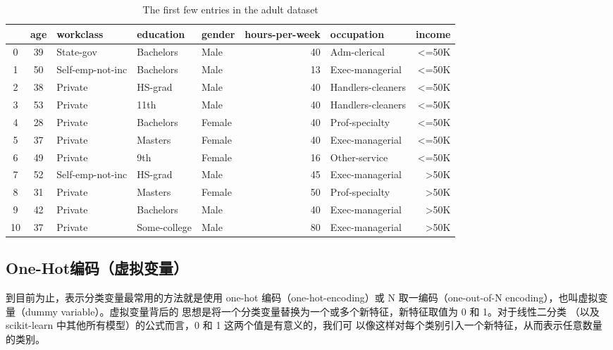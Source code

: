 \begin{table}
    \centering
    \caption{The first few entries in the adult dataset}
    \label{The first few entries in the adult dataset}
    \begin{tabular}{cclllrlr}
        \hline
           & age & workclass        & education    & gender & hours-per-week & occupation        & income           \\
        \hline
        0  & 39  & State-gov        & Bachelors    & Male   & 40             & Adm-clerical      & \textless =50K   \\
        1  & 50  & Self-emp-not-inc & Bachelors    & Male   & 13             & Exec-managerial   & \textless =50K   \\
        2  & 38  & Private          & HS-grad      & Male   & 40             & Handlers-cleaners & \textless =50K   \\
        3  & 53  & Private          & 11th         & Male   & 40             & Handlers-cleaners & \textless =50K   \\
        4  & 28  & Private          & Bachelors    & Female & 40             & Prof-specialty    & \textless =50K   \\
        5  & 37  & Private          & Masters      & Female & 40             & Exec-managerial   & \textless =50K   \\
        6  & 49  & Private          & 9th          & Female & 16             & Other-service     & \textless =50K   \\
        7  & 52  & Self-emp-not-inc & HS-grad      & Male   & 45             & Exec-managerial   & \textgreater 50K \\
        8  & 31  & Private          & Masters      & Female & 50             & Prof-specialty    & \textgreater 50K \\
        9  & 42  & Private          & Bachelors    & Male   & 40             & Exec-managerial   & \textgreater 50K \\
        10 & 37  & Private          & Some-college & Male   & 80             & Exec-managerial   & \textgreater 50K \\
        \hline
    \end{tabular}
\end{table}
\subsection{One-Hot编码（虚拟变量）}
到目前为止，表示分类变量最常用的方法就是使用 one-hot 编码（one-hot-encoding）或
N 取一编码（one-out-of-N encoding），也叫虚拟变量（dummy variable）。虚拟变量背后的
思想是将一个分类变量替换为一个或多个新特征，新特征取值为 0 和 1。对于线性二分类
（以及 scikit-learn 中其他所有模型）的公式而言，0 和 1 这两个值是有意义的，我们可
以像这样对每个类别引入一个新特征，从而表示任意数量的类别。

